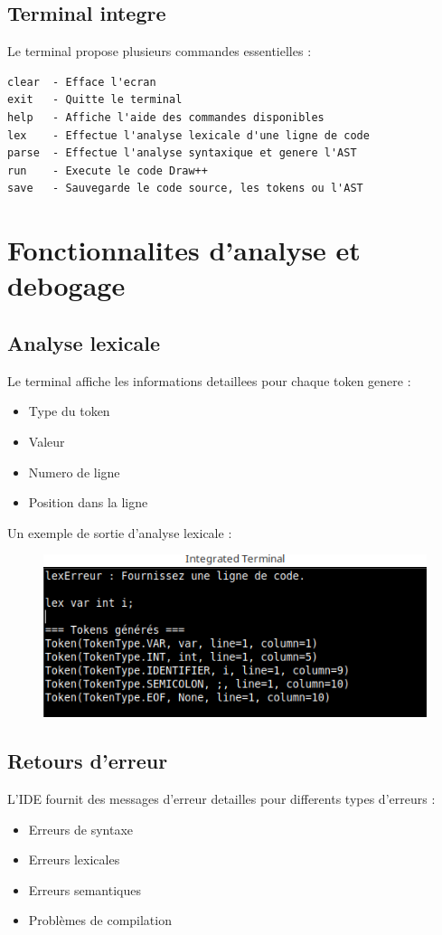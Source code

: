 \documentclass[12pt,a4paper]{report}
\begin{document}
\subsection{Terminal integre}
Le terminal propose plusieurs commandes essentielles :
\begin{lstlisting}[style=customStyle]
clear  - Efface l'ecran
exit   - Quitte le terminal
help   - Affiche l'aide des commandes disponibles
lex    - Effectue l'analyse lexicale d'une ligne de code
parse  - Effectue l'analyse syntaxique et genere l'AST
run    - Execute le code Draw++
save   - Sauvegarde le code source, les tokens ou l'AST
\end{lstlisting}


\section{Fonctionnalites d'analyse et debogage}

\subsection{Analyse lexicale}
Le terminal affiche les informations detaillees pour chaque token genere :
\begin{itemize}
    \item Type du token
    \item Valeur
    \item Numero de ligne
    \item Position dans la ligne
\end{itemize}

Un exemple de sortie d'analyse lexicale :
\begin{figure}[H]
    \centering
    \includegraphics[width=0.7\linewidth]{assets/terminal/terminal.png}
    \label{fig:enter-label}
\end{figure}

\subsection{Retours d'erreur}
L'IDE fournit des messages d'erreur detailles pour differents types d'erreurs :
\begin{itemize}
    \item Erreurs de syntaxe
    \item Erreurs lexicales
    \item Erreurs semantiques
    \item Problèmes de compilation
\end{itemize}
\end{document}
